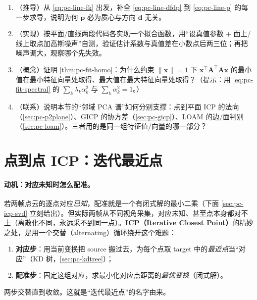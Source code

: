 \begin{practice}
\begin{enumerate}
  \item （推导）从 \cref{eq:pc-line-fk} 出发，补全 \cref{eq:pc-line-dfdp} 到 \cref{eq:pc-line-p} 的每一步求导，说明为何 $\mathbf{p}$ 必为质心与方向 $\mathbf{d}$ 无关。
  \item （实现）按平面/直线两段代码各实现一个拟合函数，用“设真值参数 + 面上/线上取点加高斯噪声”自测，验证估计系数与真值差在小数点后两三位；再把噪声调大，观察哪个先失效。
  \item （概念）证明 \cref{thm:pc-fit-homo}：为什么约束 $\|\mathbf{x}\|=1$ 下 $\mathbf{x}^\top\mathbf{A}^\top\mathbf{A}\mathbf{x}$ 的最小值在最小特征向量处取得、最大值在最大特征向量处取得？（提示：用 \cref{eq:pc-fit-spectral} 的 $\sum_k\lambda_k\alpha_k^2$ 与 $\sum_k\alpha_k^2=1$。）
  \item （联系）说明本节的“邻域 PCA 谱”如何分别支撑：点到平面 ICP 的法向（\cref{sec:pc-p2plane}）、GICP 的协方差（\cref{sec:pc-gicp}）、LOAM 的边/面判别（\cref{sec:pc-loam}）。三者用的是同一组特征值/向量的哪一部分？
\end{enumerate}
\end{practice}

\section{点到点 ICP：迭代最近点}
\label{sec:pc-icp}

\paragraph{动机：对应未知时怎么配准。}
若两帧点云的逐点对应\emph{已知}，配准就是一个有闭式解的最小二乘（下面 \cref{sec:pc-icp-svd} 立刻给出）。但实际两帧从不同视角采集，对应未知、甚至点本身都对不上（离散化不同，永远采不到同一点）。\textbf{ICP（Iterative Closest Point）}的精妙之处，是用一个交替（alternating）循环绕开这个难题\cite{besl1992icp,carlone2026handbook}：
\begin{enumerate}
  \item \textbf{对应步}：用当前变换把 source 搬过去，为每个点取 target 中的\emph{最近点}当“对应”（KD 树，\cref{sec:pc-kdtree}）；
  \item \textbf{配准步}：固定这组对应，求最小化对应点距离的\emph{最优变换}（闭式解）。
\end{enumerate}
两步交替直到收敛。这就是“迭代最近点”的名字由来。

